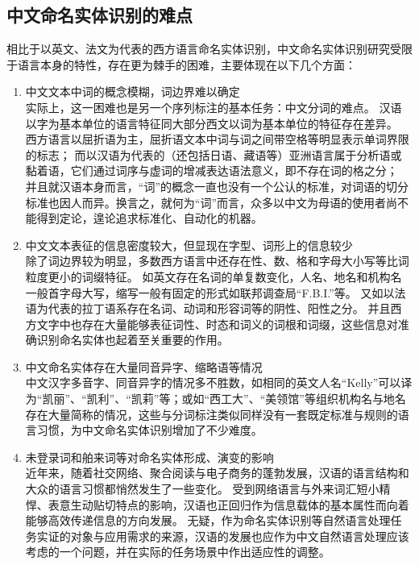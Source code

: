 \subsection{中文命名实体识别的难点}
相比于以英文、法文为代表的西方语言命名实体识别，中文命名实体识别研究受限于语言本身的特性，存在更为棘手的困难，主要体现在以下几个方面：
\begin{enumerate}
    \item 中文文本中词的概念模糊，词边界难以确定\\
        实际上，这一困难也是另一个序列标注的基本任务：中文分词的难点。
        汉语以字为基本单位的语言特征同大部分西文以词为基本单位的特征存在差异。
        西方语言以屈折语为主，屈折语文本中词与词之间带空格等明显表示单词界限的标志；
        而以汉语为代表的（还包括日语、藏语等）亚洲语言属于分析语或黏着语，它们通过词序与虚词的增减表达语法意义，即不存在词的格之分；
        并且就汉语本身而言，“词”的概念一直也没有一个公认的标准，对词语的切分标准也因人而异。换言之，就何为“词”而言，众多以中文为母语的使用者尚不能得到定论，遑论追求标准化、自动化的机器。
    \item 中文文本表征的信息密度较大，但显现在字型、词形上的信息较少\\
        除了词边界较为明显，多数西方语言中还存在性、数、格和字母大小写等比词粒度更小的词缀特征。
        如英文存在名词的单复数变化，人名、地名和机构名一般首字母大写，缩写一般有固定的形式如联邦调查局“F.B.I.”等。
        又如以法语为代表的拉丁语系存在名词、动词和形容词等的阴性、阳性之分。
        并且西方文字中也存在大量能够表征词性、时态和词义的词根和词缀，这些信息对准确识别命名实体也起着至关重要的作用。
    \item 中文命名实体存在大量同音异字、缩略语等情况\\
        中文汉字多音字、同音异字的情况多不胜数，如相同的英文人名“Kelly”可以译为“凯丽”、“凯利”、“凯莉”等；或如“西工大”、“美领馆”等组织机构名与地名存在大量简称的情况，这些与分词标注类似同样没有一套既定标准与规则的语言习惯，为中文命名实体识别增加了不少难度。
    \item 未登录词和舶来词等对命名实体形成、演变的影响\\
        近年来，随着社交网络、聚合阅读与电子商务的蓬勃发展，汉语的语言结构和大众的语言习惯都悄然发生了一些变化。
        受到网络语言与外来词汇短小精悍、表意生动贴切特点的影响，汉语也正回归作为信息载体的基本属性而向着能够高效传递信息的方向发展。
        无疑，作为命名实体识别等自然语言处理任务实证的对象与应用需求的来源，汉语的发展也应作为中文自然语言处理应该考虑的一个问题，并在实际的任务场景中作出适应性的调整。
\end{enumerate}
